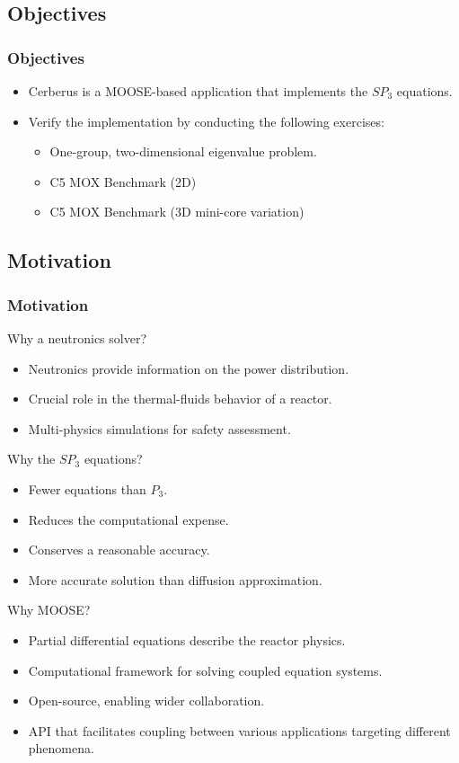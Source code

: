 \subsection{Objectives}

\begin{frame}
\frametitle{Objectives}
  \begin{itemize}
    \item Cerberus is a MOOSE-based application that implements the $SP_3$ equations.
    \item Verify the implementation by conducting the following exercises:
      \begin{itemize}
        \item One-group, two-dimensional eigenvalue problem.
        \item C5 MOX Benchmark (2D)
        \item C5 MOX Benchmark (3D mini-core variation)
  	  \end{itemize}
  \end{itemize}
\end{frame}


\subsection{Motivation}

\begin{frame}
\frametitle{Motivation}
  
  Why a neutronics solver?
  \begin{itemize}
    \item Neutronics provide information on the power distribution.
    \item Crucial role in the thermal-fluids behavior of a reactor.
    \item Multi-physics simulations for safety assessment.
  \end{itemize}

  Why the $SP_3$ equations?
  \begin{itemize}
    \item Fewer equations than $P_3$.
    \item Reduces the computational expense.
    \item Conserves a reasonable accuracy.
    \item More accurate solution than diffusion approximation.
  \end{itemize}
  
  Why MOOSE?
  \begin{itemize}
    \item Partial differential equations describe the reactor physics.
    \item Computational framework for solving coupled equation systems.
    \item Open-source, enabling wider collaboration.
    \item API that facilitates coupling between various applications targeting different phenomena.
  \end{itemize}

\end{frame}
